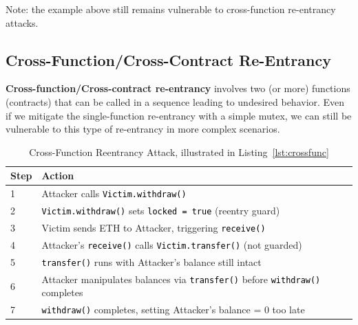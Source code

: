 \documentclass[12pt]{article}
\newcommand{\codegrey}[1]{%
  \texttt{\colorbox{black!4}{\textcolor{black}{#1}}}%
}
\begin{document}
\noindent
Note: the example above still remains vulnerable to cross-function re-entrancy attacks.

\subsection{Cross-Function/Cross-Contract Re-Entrancy}

\textbf{Cross-function/Cross-contract re-entrancy} involves two (or more) functions (contracts) that can be called in a sequence leading to undesired behavior. Even if we mitigate the single-function re-entrancy with a simple mutex, we can still be vulnerable to this type of re-entrancy in more complex scenarios.

\begin{table}[H]
    \centering
    \begin{tabular}{p{1.0cm}|p{\dimexpr\textwidth-1cm\relax}}
        \textbf{Step} & \textbf{Action}                                                                                \\
        \hline
        1             & Attacker calls \codegrey{Victim.withdraw()}                                                    \\
        \hline
        2             & \codegrey{Victim.withdraw()} sets \codegrey{locked = true} (reentry guard)                     \\
        \hline
        3             & Victim sends ETH to Attacker, triggering \codegrey{receive()}                                  \\
        \hline
        4             & Attacker's \codegrey{receive()} calls \codegrey{Victim.transfer()} (not guarded)               \\
        \hline
        5             & \codegrey{transfer()} runs with Attacker's balance still intact                                \\
        \hline
        6             & Attacker manipulates balances via \codegrey{transfer()} before \codegrey{withdraw()} completes \\
        \hline
        7             & \codegrey{withdraw()} completes, setting Attacker's balance = 0 too late                       \\
    \end{tabular}
    \caption{Cross-Function Reentrancy Attack, illustrated in Listing~\ref{lst:crossfunc}}
    \label{tab:reentrancy}
\end{table}
\end{document}
